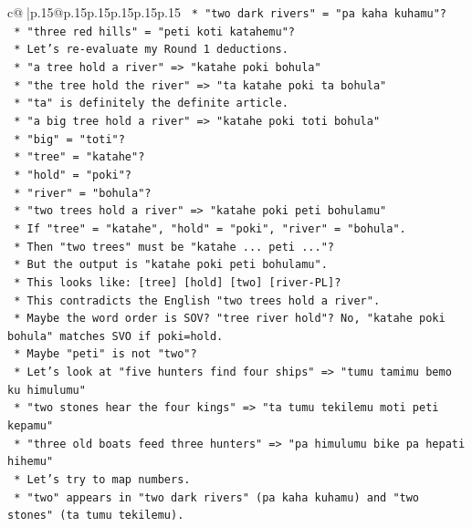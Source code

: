 \documentclass{article}
\begin{document}
{\begin{supertabular}{c@{$\;$}|p{.15\linewidth}@{}p{.15\linewidth}p{.15\linewidth}p{.15\linewidth}p{.15\linewidth}p{.15\linewidth}}
{{{\texttt{        *   "two dark rivers" = "pa kaha kuhamu"?} \\
\texttt{        *   "three red hills" = "peti koti katahemu"?} \\
\texttt{    *   Let's re{-}evaluate my Round 1 deductions.} \\
\texttt{    *   "a tree hold a river" => "katahe poki bohula"} \\
\texttt{    *   "the tree hold the river" => "ta katahe poki ta bohula"} \\
\texttt{        *   "ta" is definitely the definite article.} \\
\texttt{    *   "a big tree hold a river" => "katahe poki toti bohula"} \\
\texttt{        *   "big" = "toti"?} \\
\texttt{        *   "tree" = "katahe"?} \\
\texttt{        *   "hold" = "poki"?} \\
\texttt{        *   "river" = "bohula"?} \\
\texttt{    *   "two trees hold a river" => "katahe poki peti bohulamu"} \\
\texttt{        *   If "tree" = "katahe", "hold" = "poki", "river" = "bohula".} \\
\texttt{        *   Then "two trees" must be "katahe ... peti ..."?} \\
\texttt{        *   But the output is "katahe poki peti bohulamu".} \\
\texttt{        *   This looks like: {[}tree{]} {[}hold{]} {[}two{]} {[}river{-}PL{]}?} \\
\texttt{        *   This contradicts the English "two trees hold a river".} \\
\texttt{        *   Maybe the word order is SOV? "tree river hold"? No, "katahe poki bohula" matches SVO if poki=hold.} \\
\texttt{        *   Maybe "peti" is not "two"?} \\
\texttt{        *   Let's look at "five hunters find four ships" => "tumu tamimu bemo ku himulumu"} \\
\texttt{        *   "two stones hear the four kings" => "ta tumu tekilemu moti peti kepamu"} \\
\texttt{        *   "three old boats feed three hunters" => "pa himulumu bike pa hepati hihemu"} \\
\texttt{        *   Let's try to map numbers.} \\
\texttt{        *   "two" appears in "two dark rivers" (pa kaha kuhamu) and "two stones" (ta tumu tekilemu).} \\
}}}
\end{supertabular}}
\end{document}
